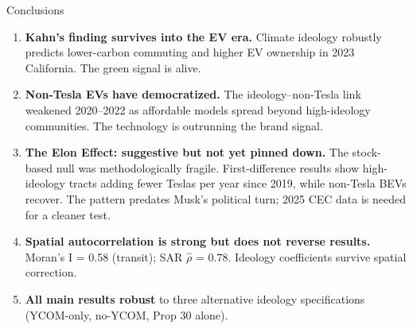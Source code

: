\documentclass[aspectratio=169,t]{beamer}
\begin{document}
\begin{frame}{Conclusions}
  \begin{enumerate}
    \item \textbf{Kahn's finding survives into the EV era.}
    Climate ideology robustly predicts lower-carbon commuting and higher EV ownership
    in 2023 California. The green signal is alive.

    \vspace{0.4em}
    \item \textbf{Non-Tesla EVs have democratized.}
    The ideology--non-Tesla link weakened 2020--2022 as affordable models spread
    beyond high-ideology communities. The technology is outrunning the brand signal.

    \vspace{0.4em}
    \item \textbf{The Elon Effect: suggestive but not yet pinned down.}
    The stock-based null was methodologically fragile. First-difference results show
    high-ideology tracts adding fewer Teslas per year since 2019, while non-Tesla
    BEVs recover. The pattern predates Musk's political turn; 2025 CEC data is
    needed for a cleaner test.

    \vspace{0.4em}
    \item \textbf{Spatial autocorrelation is strong but does not reverse results.}
    Moran's I = 0.58 (transit); SAR $\hat{\rho}$ = 0.78. Ideology coefficients
    survive spatial correction.

    \vspace{0.4em}
    \item \textbf{All main results robust} to three alternative ideology specifications
    (YCOM-only, no-YCOM, Prop 30 alone).
  \end{enumerate}
\end{frame}
\end{document}
